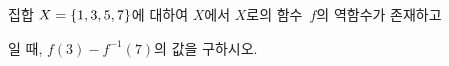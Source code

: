 집합 $X=\{1{,}\mkern3mu\mathopen{}3{,}\mkern3mu\mathopen{}5{,}\mkern3mu\mathopen{}7\}$에 대하여 $X$에서 $X$로의 함수~$f$의 역함수가 존재하고\par\smallskip{}\par\smallskip\noindent 일 때, $f(3)-f^{-1}(7)$의 값을 구하시오.
